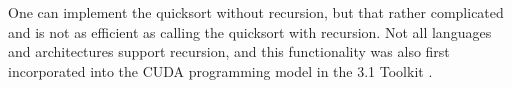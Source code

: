 One can implement the quicksort without recursion, but that rather complicated and is not as efficient as calling the quicksort with recursion. Not all languages and architectures support recursion, and this functionality was also first incorporated into the CUDA programming model in the 3.1 Toolkit \cite{cuda_3.1}.        